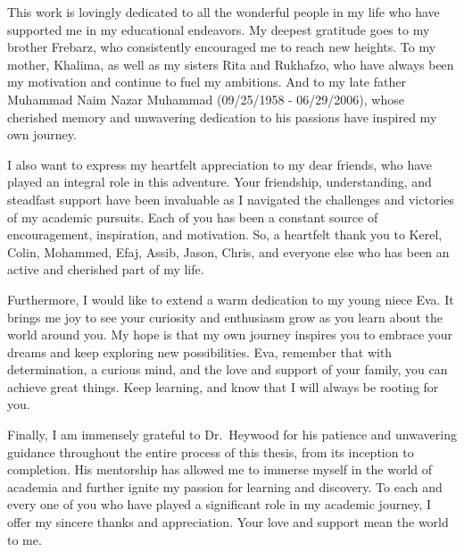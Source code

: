 \documentclass[12pt, final]{dalcsthesis}
\begin{document}
\begin{acknowledgements}
This work is lovingly dedicated to all the wonderful people in my life who have supported me in my educational endeavors. My deepest gratitude goes to my brother Frebarz, who consistently encouraged me to reach new heights. To my mother, Khalima, as well as my sisters Rita and Rukhafzo, who have always been my motivation and continue to fuel my ambitions. And to my late father Muhammad Naim Nazar Muhammad (09/25/1958 - 06/29/2006), whose cherished memory and unwavering dedication to his passions have inspired my own journey.

I also want to express my heartfelt appreciation to my dear friends, who have played an integral role in this adventure. Your friendship, understanding, and steadfast support have been invaluable as I navigated the challenges and victories of my academic pursuits. Each of you has been a constant source of encouragement, inspiration, and motivation. So, a heartfelt thank you to Kerel, Colin, Mohammed, Efaj, Assib, Jason, Chris, and everyone else who has been an active and cherished part of my life.

Furthermore, I would like to extend a warm dedication to my young niece Eva. It brings me joy to see your curiosity and enthusiasm grow as you learn about the world around you. My hope is that my own journey inspires you to embrace your dreams and keep exploring new possibilities. Eva, remember that with determination, a curious mind, and the love and support of your family, you can achieve great things. Keep learning, and know that I will always be rooting for you.

Finally, I am immensely grateful to Dr.\ Heywood for his patience and unwavering guidance throughout the entire process of this thesis, from its inception to completion. His mentorship has allowed me to immerse myself in the world of academia and further ignite my passion for learning and discovery. To each and every one of you who have played a significant role in my academic journey, I offer my sincere thanks and appreciation. Your love and support mean the world to me.
\end{acknowledgements}

\mainmatter
\end{document}
